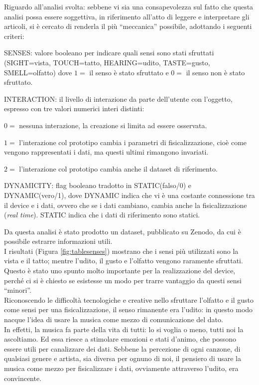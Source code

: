 \documentclass[12pt,a4paper]{report}
\begin{document}
\medskip
Riguardo all'analisi svolta: sebbene vi sia una consapevolezza sul fatto che questa analisi possa essere soggettiva, in riferimento all'atto di leggere e interpretare gli articoli, si è cercato di renderla il più ``meccanica” possibile, adottando i seguenti criteri:

\begin{compactenum}
	\item SENSES: valore booleano per indicare quali sensi sono stati sfruttati (SIGHT=vista, TOUCH=tatto, HEARING=udito, TASTE=gusto, SMELL=olfatto) dove $1=$ il senso è stato sfruttato e $0=$ il senso non è stato sfruttato.
	\item INTERACTION: il livello di interazione da parte dell'utente con l'oggetto, espresso con tre valori numerici interi distinti:
	\begin{compactitem} 
		\item $0 =$ nessuna interazione, la creazione si limita ad essere osservata.
		\item $1 =$ l'interazione col prototipo cambia i parametri di fisicalizzazione, cioè come vengono rappresentati i dati, ma questi ultimi rimangono invariati.
		\item $2 =$ l'interazione col prototipo cambia anche il dataset di riferimento.
		
	\end{compactitem}
	
	\item DYNAMICITY: flag booleano tradotto in STATIC(falso/0) e DYNAMIC(vero/1), dove DYNAMIC indica che vi è una costante connessione tra il device e i dati, ovvero che se i dati cambiano, cambia anche la fisicalizzazione (\textit{real time}). STATIC indica che i dati di riferimento sono statici. 
\end{compactenum}


Da questa analisi è stato prodotto un dataset, pubblicato su Zenodo\cite{datiAnalisi}, da cui è possibile estrarre informazioni utili. \\
I risultati (Figura \ref{fig:tablesenses}) mostrano che i sensi più utilizzati sono la vista e il tatto; mentre l'udito, il gusto e l'olfatto vengono raramente sfruttati. \\
Questo è stato uno spunto molto importante per la realizzazione del device, perché ci si è chiesto se esistesse un modo per trarre vantaggio da questi sensi ``minori''. \\
Riconoscendo le difficoltà tecnologiche e creative nello sfruttare l'olfatto e il gusto come sensi per una fisicalizzazione, il senso rimanente era l'udito: in questo modo nacque l'idea di usare la musica come mezzo di comunicazione del dato. \\%
In effetti, la musica fa parte della vita di tutti: lo si voglia o meno, tutti noi la ascoltiamo. Ed essa riesce a stimolare emozioni e stati d'animo, che possono essere utili per canalizzare dei dati. Sebbene la percezione di ogni canzone, di qualsiasi genere e artista, sia diversa per ognuno di noi, il pensiero di usare la musica come mezzo per fisicalizzare i dati, ovviamente attraverso l'udito, era convincente.\\
\end{document}
